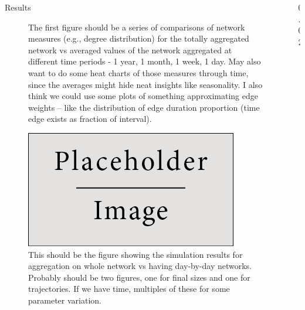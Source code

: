 \documentclass[final]{beamer} %
\newcommand{\spaceProp}{0.02}
\newcommand{\spacer}{\begin{column}{\spaceProp\paperwidth}\end{column}}
\newenvironment{threeCol}{\begin{column}[t]{0.715\paperwidth}}{\end{column}}
\begin{document}
\begin{frame}{}
\begin{columns}[t]
\begin{threeCol}
\begin{block}{Results}
\begin{figure}
    \caption{The first figure should be a series of comparisons of network measures (e.g., degree distribution) for the totally aggregated network vs averaged values of the network aggregated at different time periods - 1 year, 1 month, 1 week, 1 day.  May also want to do some heat charts of those measures through time, since the averages might hide neat insights like seasonality.  I also think we could use some plots of something approximating edge weights -- like the distribution of edge duration proportion (time edge exists as fraction of interval).}
    \end{figure}
    \begin{figure}
    \includegraphics[width=0.8\linewidth]{placeholder.jpg}
    \caption{This should be the figure showing the simulation results for aggregation on whole network vs having day-by-day networks.  Probably should be two figures, one for final sizes and one for trajectories.  If we have time, multiples of these for some parameter variation.}
    \end{figure}
    
    \end{block}
    \vfill
    \end{threeCol}
    \spacer{}
    \end{columns}
  \end{frame}
  
\end{document}
